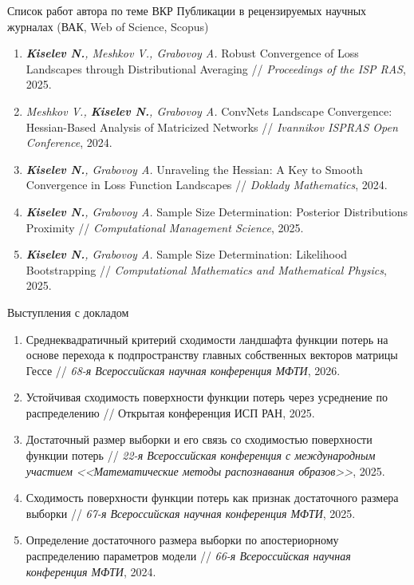 \documentclass[aspectratio=169]{beamer}
\begin{document}
\begin{frame}{Список работ автора по теме ВКР}
    \tiny
    { Публикации в рецензируемых научных журналах (ВАК, Web of Science, Scopus)}\\
    \begin{enumerate}
        \item \textit{\textbf{Kiselev N.}, Meshkov V., Grabovoy A.} Robust Convergence of Loss Landscapes through Distributional Averaging // \textit{Proceedings of the ISP RAS}, 2025.
        \item \textit{Meshkov V., \textbf{Kiselev N.}, Grabovoy A.} ConvNets Landscape Convergence: Hessian-Based Analysis of Matricized Networks // \textit{Ivannikov ISPRAS Open Conference}, 2024.
        \item \textit{\textbf{Kiselev N.}, Grabovoy A.} Unraveling the Hessian: A Key to Smooth Convergence in Loss Function Landscapes // \textit{Doklady Mathematics}, 2024.
        \item \textit{\textbf{Kiselev N.}, Grabovoy A.} Sample Size Determination: Posterior Distributions Proximity // 
        \textit{Computational Management Science}, 2025.
        \item \textit{\textbf{Kiselev N.}, Grabovoy A.} Sample Size Determination: Likelihood Bootstrapping // \textit{Computational Mathematics and Mathematical Physics}, 2025.
    \end{enumerate}
    { Выступления с докладом}\\
    \begin{enumerate}
        \item Среднеквадратичный критерий сходимости ландшафта функции потерь на основе перехода к подпространству главных собственных векторов матрицы Гессе // \textit{68-я Всероссийская научная конференция МФТИ}, 2026.
        \item Устойчивая сходимость поверхности функции потерь через усреднение по распределению // Открытая конференция ИСП РАН, 2025.
        \item Достаточный размер выборки и его связь со сходимостью поверхности функции потерь // \textit{22-я Всероссийская конференция с международным участием <<Математические методы распознавания образов>>}, 2025.
        \item Сходимость поверхности функции потерь как признак достаточного размера выборки // \textit{67-я Всероссийская научная конференция МФТИ}, 2025.
        \item Определение достаточного размера выборки по апостериорному распределению параметров модели // \textit{66-я Всероссийская научная конференция МФТИ}, 2024.
    \end{enumerate}
\end{frame}
\end{document}
